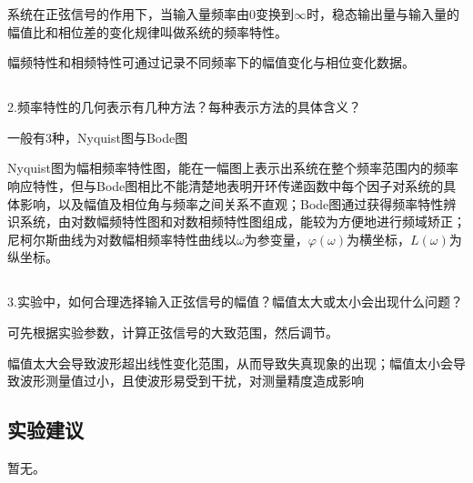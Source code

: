 \documentclass[UTF8,a4paper,10pt]{ctexart}
\begin{document}
	系统在正弦信号的作用下，当输入量频率由0变换到$\infty$时，稳态输出量与输入量的幅值比和相位差的变化规律叫做系统的频率特性。
	
	幅频特性和相频特性可通过记录不同频率下的幅值变化与相位变化数据。
	\subsection{}
	2.频率特性的几何表示有几种方法？每种表示方法的具体含义？
	
	一般有3种，Nyquist图与Bode图
	
	Nyquist图为幅相频率特性图，能在一幅图上表示出系统在整个频率范围内的频率响应特性，但与Bode图相比不能清楚地表明开环传递函数中每个因子对系统的具体影响，以及幅值及相位角与频率之间关系不直观；Bode图通过获得频率特性辨识系统，由对数幅频特性图和对数相频特性图组成，能较为方便地进行频域矫正；尼柯尔斯曲线为对数幅相频率特性曲线以$\omega$为参变量，$\varphi(\omega)$为横坐标，$L(\omega)$为纵坐标。
	
	\subsection{}
	3.实验中，如何合理选择输入正弦信号的幅值？幅值太大或太小会出现什么问题？
	
	可先根据实验参数，计算正弦信号的大致范围，然后调节。
	
	幅值太大会导致波形超出线性变化范围，从而导致失真现象的出现；幅值太小会导致波形测量值过小，且使波形易受到干扰，对测量精度造成影响
	\subsection{实验建议}
	暂无。
\end{document}
